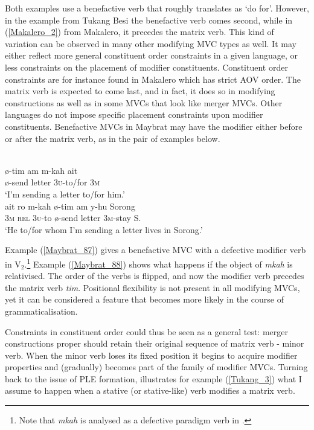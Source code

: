 Both examples use a benefactive verb that roughly translates as `do for'. However, in the example from Tukang Besi the benefactive verb comes second, while in (\ref{Makalero_2}) from Makalero, it precedes the matrix verb. This kind of variation can be observed in many other modifying MVC types as well. It may either reflect more general constituent order constraints in a given language, or less constraints on the placement of modifier constituents. Constituent order constraints are for instance found in Makalero which has strict AOV order. The matrix verb is expected to come last, and in fact, it does so in modifying constructions as well as in some  MVCs that look like merger MVCs. Other languages do not impose specific placement constraints upon modifier constituents. Benefactive MVCs in Maybrat may have the modifier either before or after the matrix verb, as in the pair of examples below.

\ea \label{Maybrat_87}
\\
\ea
\gll ø-tim am m-kah ait \\
ø-send letter 3\textsc{u}-to/for 3\textsc{m} \\
\glft `I'm sending a letter to/for him.'\\
\ex \label{Maybrat_88}
\gll ait ro m-kah ø-tim am y-hu Sorong\\
3\textsc{m} \textsc{rel} 3\textsc{u}-to ø-send letter 3\textsc{m}-stay S. \\
\glft `He to/for whom I'm sending a letter lives in Sorong.' \\ 
\z
\z

Example (\ref{Maybrat_87}) gives a benefactive MVC with a defective modifier verb in V$_2$.\footnote{Note that \textit{mkah} is analysed as a defective paradigm verb in \citet[80]{dol2007grammar}.} Example (\ref{Maybrat_88}) shows what happens if the object of \textit{mkah} is relativised. The order of the verbs is flipped, and now the modifier verb precedes the matrix verb \textit{tim}. Positional flexibility is not present in all modifying MVCs, yet it can be considered a feature that becomes more likely in the course of grammaticalisation.

Constraints in constituent order could thus be seen as a general test: merger constructions proper should retain their original sequence of matrix verb - minor verb. When the minor verb loses its fixed position it begins to acquire modifier properties and (gradually) becomes part of the family of modifier MVCs. Turning back to the issue of PLE formation,  illustrates for example (\ref{Tukang_3}) what I assume to happen when a stative (or stative-like) verb modifies a matrix verb.

